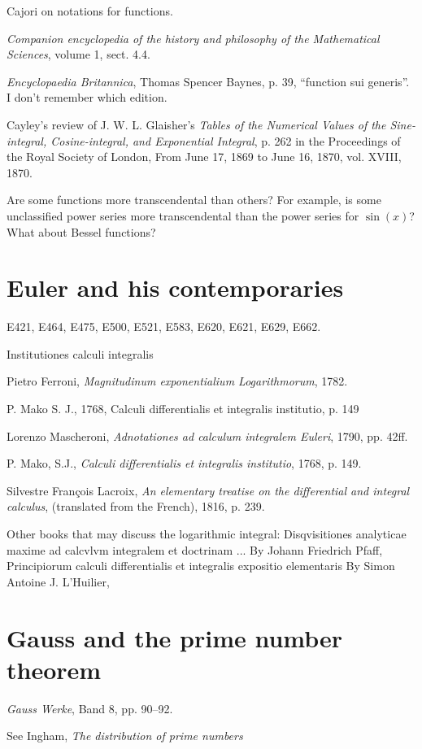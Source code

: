 \documentclass{amsart}
\begin{document}
Cajori on notations for functions.

{\em Companion encyclopedia of the history and philosophy of the Mathematical Sciences}, volume 1, sect. 4.4.

{\em Encyclopaedia Britannica}, Thomas Spencer Baynes, p. 39, ``function sui generis''. I don't remember which edition.

Cayley's review of J. W. L. Glaisher's {\em Tables of the Numerical Values of the 
Sine-integral, Cosine-integral, and Exponential Integral}, p. 262 in the
Proceedings of the Royal Society of London, From June 17, 1869 to June 16, 1870,
vol. XVIII, 1870.

Are some functions more transcendental than others? For example, is
some unclassified power series more transcendental than the power
series for $\sin(x)$? What about Bessel functions?

\section{Euler and his contemporaries}
E421, E464, E475, E500, E521, E583, E620, E621, E629, E662.

Institutiones calculi integralis

Pietro Ferroni,
{\em Magnitudinum exponentialium Logarithmorum},
1782.

P. Mako S. J., 1768,
Calculi differentialis et integralis institutio,
p. 149

Lorenzo Mascheroni,
{\em Adnotationes ad calculum integralem Euleri},
1790, pp. 42ff.

P. Mako, S.J.,
{\em Calculi differentialis et integralis institutio}, 1768,
p. 149.

Silvestre Fran{\c c}ois Lacroix,
{\em An elementary treatise on the differential and integral calculus},
(translated from the French),
1816, p. 239.

Other books that may discuss the logarithmic integral:
Disqvisitiones analyticae maxime ad calcvlvm integralem et doctrinam ...
 By Johann Friedrich Pfaff, 
Principiorum calculi differentialis et integralis expositio elementaris
 By Simon Antoine J. L'Huilier, 

\section{Gauss and the prime number theorem}
{\em Gauss Werke}, Band 8, pp. 90--92.

See Ingham, {\em The distribution of prime numbers}
\end{document}
